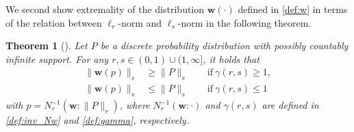 \documentclass[conference, draftcls, onecolumn]{IEEEtran}
\theoremstyle{plain}
\newtheorem{theorem}{Theorem}
\newcommand{\bvec}[1]{\boldsymbol{#1}}
\begin{document}
We second show extremality of the distribution $\bvec{w}( \cdot )$ defined in \eqref{def:w} in terms of the relation between $\ell_{r}$-norm and $\ell_{s}$-norm in the following theorem.



\begin{theorem}[{\cite[Lemma~3]{itw2016_reject}}]
\label{th:w}
Let $P$ be a discrete probability distribution with possibly countably infinite support.
For any $r, s \in (0, 1) \cup (1, \infty]$, it holds that
\begin{align}
\| \bvec{w}( p ) \|_{s}
& \ge
\| P \|_{s}
\qquad \mathrm{if} \ \gamma( r, s ) \ge 1 ,
\\
\| \bvec{w}( p ) \|_{s}
& \le
\| P \|_{s}
\qquad \mathrm{if} \ \gamma( r, s ) \le 1
\end{align}
with $p = N_{r}^{-1}( \bvec{w} : \| P \|_{r} )$, where $N_{r}^{-1}( \bvec{w} : \cdot )$ and $\gamma( r, s )$ are defined in \eqref{def:inv_Nw} and \eqref{def:gamma}, respectively.
\end{theorem}
\end{document}
